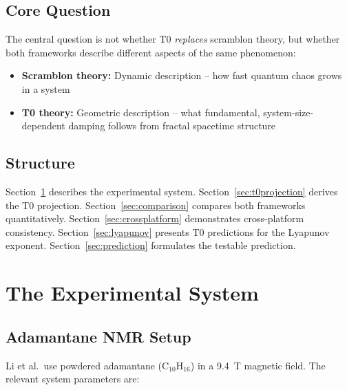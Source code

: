 \subsection{Core Question}

The central question is not whether T0 \emph{replaces} scramblon theory, but whether both frameworks describe different aspects of the same phenomenon:
\begin{itemize}
	\item \textbf{Scramblon theory:} Dynamic description -- how fast quantum chaos grows in a system
	\item \textbf{T0 theory:} Geometric description -- what fundamental, system-size-dependent damping follows from fractal spacetime structure
\end{itemize}

\subsection{Structure}

Section~\ref{sec:system} describes the experimental system. Section~\ref{sec:t0projection} derives the T0 projection. Section~\ref{sec:comparison} compares both frameworks quantitatively. Section~\ref{sec:crossplatform} demonstrates cross-platform consistency. Section~\ref{sec:lyapunov} presents T0 predictions for the Lyapunov exponent. Section~\ref{sec:prediction} formulates the testable prediction.


\section{The Experimental System}
\label{sec:system}

\subsection{Adamantane NMR Setup}

Li et al.\ use powdered adamantane (C$_{10}$H$_{16}$) in a 9.4~T magnetic field. The relevant system parameters are:

\begin{table}[h]
	\centering
	\caption{Experimental parameters of the NMR system (Li et al.)}
	\label{tab:system_params}
\end{table}


